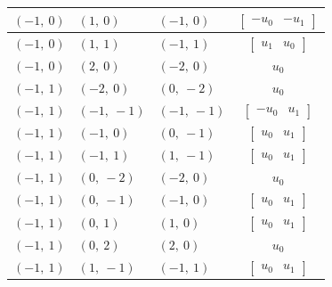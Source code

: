 \documentclass[11pt]{article}
\theoremstyle{definition}
\begin{document}
\begin{longtable}{|l|l|l|c|}
    \hline
    $\left( -1, \  0\right)$ & $\left( 1, \  0\right)$ & $\left( -1, \  0\right)$ & $\left[\begin{matrix}- u_{0} & - u_{1}\end{matrix}\right]$ \\
    \hline
    $\left( -1, \  0\right)$ & $\left( 1, \  1\right)$ & $\left( -1, \  1\right)$ & $\left[\begin{matrix}u_{1} & u_{0}\end{matrix}\right]$ \\
    \hline
    $\left( -1, \  0\right)$ & $\left( 2, \  0\right)$ & $\left( -2, \  0\right)$ & $u_{0}$ \\
    \hline
    $\left( -1, \  1\right)$ & $\left( -2, \  0\right)$ & $\left( 0, \  -2\right)$ & $u_{0}$ \\
    \hline
    $\left( -1, \  1\right)$ & $\left( -1, \  -1\right)$ & $\left( -1, \  -1\right)$ & $\left[\begin{matrix}- u_{0} & u_{1}\end{matrix}\right]$ \\
    \hline
    $\left( -1, \  1\right)$ & $\left( -1, \  0\right)$ & $\left( 0, \  -1\right)$ & $\left[\begin{matrix}u_{0} & u_{1}\end{matrix}\right]$ \\
    \hline
    $\left( -1, \  1\right)$ & $\left( -1, \  1\right)$ & $\left( 1, \  -1\right)$ & $\left[\begin{matrix}u_{0} & u_{1}\end{matrix}\right]$ \\
    \hline
    $\left( -1, \  1\right)$ & $\left( 0, \  -2\right)$ & $\left( -2, \  0\right)$ & $u_{0}$ \\
    \hline
    $\left( -1, \  1\right)$ & $\left( 0, \  -1\right)$ & $\left( -1, \  0\right)$ & $\left[\begin{matrix}u_{0} & u_{1}\end{matrix}\right]$ \\
    \hline
    $\left( -1, \  1\right)$ & $\left( 0, \  1\right)$ & $\left( 1, \  0\right)$ & $\left[\begin{matrix}u_{0} & u_{1}\end{matrix}\right]$ \\
    \hline
    $\left( -1, \  1\right)$ & $\left( 0, \  2\right)$ & $\left( 2, \  0\right)$ & $u_{0}$ \\
    \hline
    $\left( -1, \  1\right)$ & $\left( 1, \  -1\right)$ & $\left( -1, \  1\right)$ & $\left[\begin{matrix}u_{0} & u_{1}\end{matrix}\right]$ \\

\end{longtable}
\end{document}

